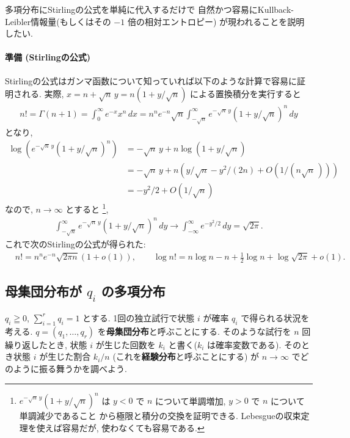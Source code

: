 \documentclass[12pt,twoside]{jarticle}
\theoremstyle{jplain}
\theoremstyle{jplain}
\theoremstyle{jplain}
\numberwithin{theorem}{section}
\numberwithin{equation}{section}
\numberwithin{figure}{section}
\numberwithin{table}{section}
\begin{document}
多項分布にStirlingの公式を単純に代入するだけで
自然かつ容易にKullback-Leibler情報量(もしくはその $-1$ 倍の相対エントロピー)
が現われることを説明したい.

\paragraph{準備 (Stirlingの公式)}
Stirlingの公式はガンマ函数について知っていれば以下のような計算で容易に証明される.
実際, $x=n+\sqrt{n}\,y=n(1+y/\sqrt{n})$ による置換積分を実行すると
\begin{align*}
n!=\Gamma(n+1)=\int_0^\infty e^{-x}x^n\,dx
=n^n e^{-n}\sqrt{n}\int_{-\sqrt{n}}^\infty e^{-\sqrt{n}\,y}(1+y/\sqrt{n})^n\,dy
\end{align*}
となり,
\begin{align*}
\log(e^{-\sqrt{n}\,y}(1+y/\sqrt{n})^n)
&
=-\sqrt{n}\,y+n\log(1+y/\sqrt{n})
\\ &
=-\sqrt{n}\,y+n\left(y/\sqrt{n}-y^2/(2n)+O\left(1/(n\sqrt{n}\,)\right)\right)
\\ &
= -y^2/2 + O\left(1/\sqrt{n}\right)
\end{align*}
なので, $n\to\infty$ とすると%
\footnote{$e^{-\sqrt{n}\,y}(1+y/\sqrt{n})^n$ は
$y<0$ で $n$ について単調増加, $y>0$ で $n$ について単調減少であること
から極限と積分の交換を証明できる. Lebesgueの収束定理を使えば容易だが,
使わなくても容易である.},
\begin{align*}
\int_{-\sqrt{n}}^\infty e^{-\sqrt{n}\,y}(1+y/\sqrt{n})^n\,dy
\longrightarrow
\int_{-\infty}^\infty e^{-y^2/2}\,dy = \sqrt{2\pi}.
\end{align*}
これで次のStirlingの公式が得られた:
\begin{align*}
&
n! = n^n e^{-n}\sqrt{2\pi n}(1+o(1)),
\qquad
\log n! = n \log n - n +\frac{1}{2}\log n + \log\sqrt{2\pi} + o(1).
\end{align*}


\subsection{母集団分布が $q_i$ の多項分布}

$q_i\geqq 0$, $\sum_{i=1}^r q_i=1$ とする.
1回の独立試行で状態 $i$ が確率 $q_i$ で得られる状況を考える.
$q=(q_1,\ldots,q_r)$ を{\bfseries 母集団分布}と呼ぶことにする.
そのような試行を $n$ 回繰り返したとき,
状態 $i$ が生じた回数を $k_i$ と書く($k_i$ は確率変数である).
そのとき状態 $i$ が生じた割合 $k_i/n$ (これを{\bfseries 経験分布}と呼ぶことにする)
が $n\to\infty$ でどのように振る舞うかを調べよう.
\end{document}
